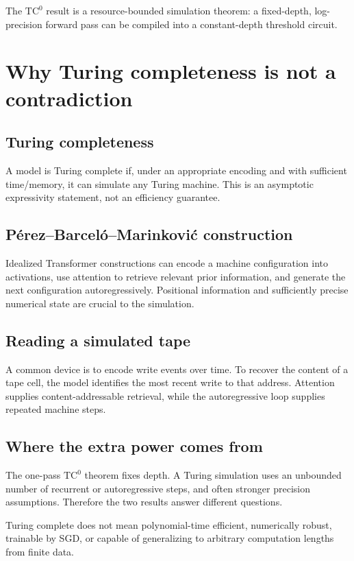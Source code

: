 \documentclass[11pt,a4paper,oneside,openany]{memoir}
\theoremstyle{definition}
\begin{document}
\begin{presentbox}
The $\mathrm{TC}^0$ result is a resource-bounded simulation theorem: a fixed-depth, log-precision forward pass can be compiled into a constant-depth threshold circuit.
\end{presentbox}

\chapter{Why Turing completeness is not a contradiction}
\section{Turing completeness}
A model is Turing complete if, under an appropriate encoding and with sufficient time/memory, it can simulate any Turing machine.  This is an asymptotic expressivity statement, not an efficiency guarantee.

\section{P\'erez--Barcel\'o--Marinkovi\'c construction}
Idealized Transformer constructions can encode a machine configuration into activations, use attention to retrieve relevant prior information, and generate the next configuration autoregressively.  Positional information and sufficiently precise numerical state are crucial to the simulation.

\section{Reading a simulated tape}
A common device is to encode write events over time.  To recover the content of a tape cell, the model identifies the most recent write to that address.  Attention supplies content-addressable retrieval, while the autoregressive loop supplies repeated machine steps.

\section{Where the extra power comes from}
The one-pass $\mathrm{TC}^0$ theorem fixes depth.  A Turing simulation uses an unbounded number of recurrent or autoregressive steps, and often stronger precision assumptions.  Therefore the two results answer different questions.

\begin{warningbox}
Turing complete does not mean polynomial-time efficient, numerically robust, trainable by SGD, or capable of generalizing to arbitrary computation lengths from finite data.
\end{warningbox}
\end{document}
